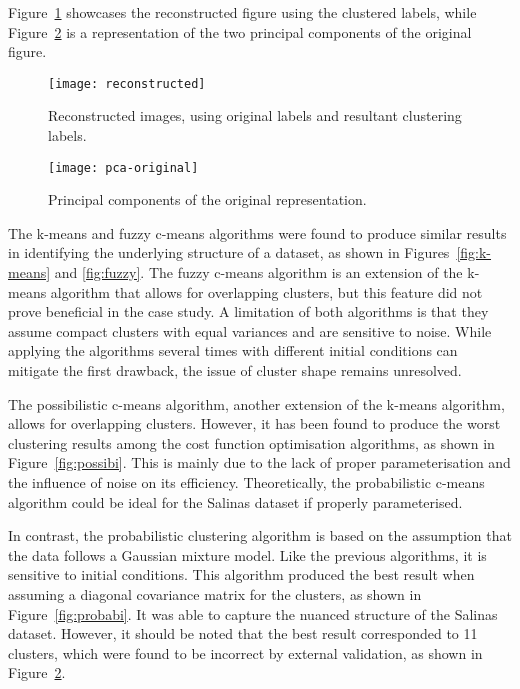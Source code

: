 \documentclass[
  course = {{DS12E Clustering Algorithms}},
  quartile = {{2}},
  assignment = ,
  name = {{Michael Darmanis ; Vasilios Venieris}},
  studentnumber = {{7115152200004 ; 7115152200017}},
  email = {{mdarm@di.uoa.gr ; vvenieris@di.uoa.gr}},
  firstexercise = 1
]{aga-homework}
\begin{document}
Figure~\ref{fig:reconstructed} showcases the reconstructed figure using the clustered labels, while Figure~\ref{fig:original} is a representation of the two principal components of the original figure.

\begin{figure}[htbp!]
	\centering
    \texttt{[image: reconstructed]}
    \caption{Reconstructed images, using original labels and resultant clustering labels.}
    \label{fig:reconstructed}
\end{figure}

\begin{figure}[htbp!]
	\centering
    \texttt{[image: pca-original]}
    \caption{Principal components of the original representation.}
    \label{fig:original}
\end{figure}

The k-means and fuzzy c-means algorithms were found to produce similar results in identifying the underlying structure of a dataset, as shown in Figures~\ref{fig:k-means} and \ref{fig:fuzzy}. The fuzzy c-means algorithm is an extension of the k-means algorithm that allows for overlapping clusters, but this feature did not prove beneficial in the case study. A limitation of both algorithms is that they assume compact clusters with equal variances and are sensitive to noise. While applying the algorithms several times with different initial conditions can mitigate the first drawback, the issue of cluster shape remains unresolved.

The possibilistic c-means algorithm, another extension of the k-means algorithm, allows for overlapping clusters. However, it has been found to produce the worst clustering results among the cost function optimisation algorithms, as shown in Figure~\ref{fig:possibi}. This is mainly due to the lack of proper parameterisation and the influence of noise on its efficiency. Theoretically, the probabilistic c-means algorithm could be ideal for the Salinas dataset if properly parameterised.

In contrast, the probabilistic clustering algorithm is based on the assumption that the data follows a Gaussian mixture model. Like the previous algorithms, it is sensitive to initial conditions. This algorithm produced the best result when assuming a diagonal covariance matrix for the clusters, as shown in Figure~\ref{fig:probabi}. It was able to capture the nuanced structure of the Salinas dataset. However, it should be noted that the best result corresponded to 11 clusters, which were found to be incorrect by external validation, as shown in Figure~\ref{fig:original}.
\end{document}
